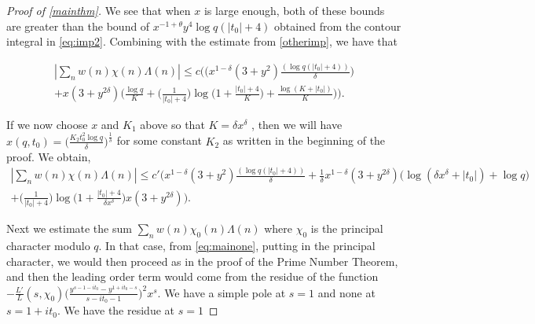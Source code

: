 \documentclass[10pt,a4paper]{amsart}
\begin{document}
\begin{proof}[Proof of \cref{mainthm}]



We see that when $x$ is large enough, both of these bounds are greater than the bound of $x^{-1+\theta}y^{4}\log q(|t_0|+4)$ obtained from the contour integral in \cref{eq:imp2}. Combining with the estimate from \cref{otherimp}, we have that


\begin{multline}
     |\sum_{n}w(n)\chi(n)\Lambda(n)|\leq c\Bigg(\Big(x^{1-\delta}(3+y^{2}) \frac{(\log q(|t_0|+4))}{\delta}\Big)\\ + x(3+ y^{2\delta})\Bigg(\frac{\log q}{K}+ \Big(\frac{1}{|t_0|+4}\Big)\log\Big(1+ \frac{|t_0|+4}{K}\Big)+\frac{\log(K+|t_0|)}{K} \Bigg)\Bigg).
\end{multline}

\noindent If we now choose $x$ and  $K_1$ above so that $K=\delta x^{\delta}$ , then we will have $x(q,t_0)=\Big(\frac{K_2 t_{0}^{2}\log q}{\delta}\Big)^{\frac{1}{\delta}}$ for some constant $K_2$ as written in the beginning of the proof. We obtain,
\begin{multline}\label{eq:oneimp}
     |\sum_{n}w(n)\chi(n)\Lambda(n)|\leq c'\Big(x^{1-\delta}(3+y^{2}) \frac{(\log q(|t_0|+4))}{\delta}+\frac{1}{\delta}x^{1-\delta}(3+y^{2\delta})\big(\log (\delta x^{\delta}+|t_0|)+\log q \big)\\ +\Big(\frac{1}{|t_0|+4}\Big)\log\Big(1+ \frac{|t_0|+4}{\delta x^{\delta}}\Big) x(3+y^{2\delta})\Big).
\end{multline}

Next we estimate the sum  $\sum\limits_{n}w(n)\chi_0(n)\Lambda(n)$ where $\chi_0$ is the principal character modulo $q$. In that case, from \cref{eq:mainone}, putting in the principal character, we would then proceed as in the proof of the Prime Number Theorem, and then the leading order term would come from the residue of the function $-\frac{L'}{L}(s,\chi_0) \Big(\frac{y^{s-1-it_0}-y^{1+it_0-s}}{s-it_0-1} \Big)^{2}x^{s}$. We have a simple pole at $s=1$ and none at $s=1+it_0$. We have the residue at $s=1$ 


\end{proof}
\end{document}
